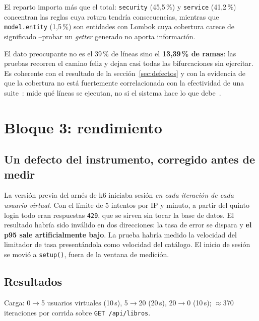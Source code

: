 \documentclass[11pt,a4paper]{article}
\begin{document}
El reparto importa más que el total: \texttt{security} (45,5\,\%) y
\texttt{service} (41,2\,\%) concentran las reglas cuya rotura tendría
consecuencias, mientras que \texttt{model.entity} (1,5\,\%) son entidades con
Lombok cuya cobertura carece de significado --probar un \emph{getter} generado no
aporta información.

El dato preocupante no es el 39\,\% de líneas sino el \textbf{13,39\,\% de ramas}:
las pruebas recorren el camino feliz y dejan casi todas las bifurcaciones sin
ejercitar. Es coherente con el resultado de la sección~\ref{sec:defectos} y con la
evidencia de que la cobertura no está fuertemente correlacionada con la
efectividad de una suite~\cite{inozemtseva2014coverage}: mide qué líneas se
ejecutan, no si el sistema hace lo que debe~\cite{zhu1997software}.

\section{Bloque 3: rendimiento}\label{sec:rendimiento}

\subsection{Un defecto del instrumento, corregido antes de medir}

La versión previa del arnés de k6 iniciaba sesión \emph{en cada iteración de cada
usuario virtual}. Con el límite de 5 intentos por IP y minuto, a partir del quinto
login todo eran respuestas \texttt{429}, que se sirven sin tocar la base de datos.
El resultado habría sido inválido en dos direcciones: la tasa de error se dispara
y \textbf{el p95 sale artificialmente bajo}. La prueba habría medido la velocidad
del limitador de tasa presentándola como velocidad del catálogo. El inicio de
sesión se movió a \texttt{setup()}, fuera de la ventana de medición.

\subsection{Resultados}

Carga: 0$\to$5 usuarios virtuales (10\,s), 5$\to$20 (20\,s), 20$\to$0 (10\,s);
$\approx$370 iteraciones por corrida sobre \texttt{GET /api/libros}.
\end{document}
